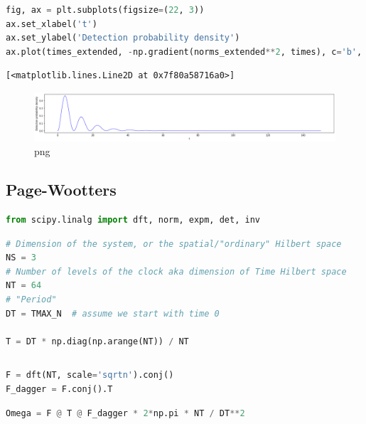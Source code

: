 \begin{lstlisting}[language=Python]
fig, ax = plt.subplots(figsize=(22, 3))
ax.set_xlabel('t')
ax.set_ylabel('Detection probability density')
ax.plot(times_extended, -np.gradient(norms_extended**2, times), c='b', linewidth=1)
\end{lstlisting}

\begin{lstlisting}
[<matplotlib.lines.Line2D at 0x7f80a58716a0>]
\end{lstlisting}

\begin{figure}
\centering
\includegraphics[width=0.666\linewidth]{tex/appendix/nb/jupyter/3lev/output_38_1.png}
\caption{png}
\end{figure}

\hypertarget{page-wootters}{%
\subsection{Page-Wootters}\label{page-wootters}}

\begin{lstlisting}[language=Python]
from scipy.linalg import dft, norm, expm, det, inv
\end{lstlisting}

\begin{lstlisting}[language=Python]
# Dimension of the system, or the spatial/"ordinary" Hilbert space
NS = 3
# Number of levels of the clock aka dimension of Time Hilbert space
NT = 64
# "Period"
DT = TMAX_N  # assume we start with time 0

T = DT * np.diag(np.arange(NT)) / NT
\end{lstlisting}

\begin{lstlisting}[language=Python]
\end{lstlisting}

\begin{lstlisting}[language=Python]
F = dft(NT, scale='sqrtn').conj()
F_dagger = F.conj().T
\end{lstlisting}

\begin{lstlisting}[language=Python]
Omega = F @ T @ F_dagger * 2*np.pi * NT / DT**2
\end{lstlisting}

